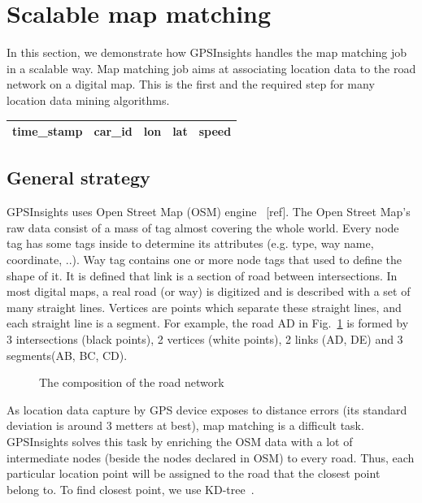 \documentclass{acm_proc_article-sp}
\begin{document}
\section{Scalable map matching}

In this section, we demonstrate how GPSInsights handles the map matching job in a scalable way. Map matching job aims at associating location data to the road network on a digital map. This is the first and the required step for many location data mining algorithms. 

\begin{table}[h]
\centering
\begin{tabular}{|c|c|c|c|c|}
\hline
\textbf{time\_stamp} & \textbf{car\_id} & \textbf{lon}   & \textbf{lat} & \textbf{speed} \\ \hline
\end{tabular}
\end{table}
	
\subsection{General strategy} \label{ssec:links}

GPSInsights uses Open Street Map (OSM) engine ~[ref]. The Open Street Map's raw data consist of a mass of tag almost covering the whole world. Every node tag has some tags inside to determine its attributes (e.g. type, way name, coordinate, ..). Way tag contains one or more node tags that used to define the shape of it. It is defined that link is a section of road between intersections. In most digital maps, a real road (or way) is digitized and is described with a set of many straight lines. Vertices are points which separate these straight lines, and each straight line is a segment. For example, the road AD in Fig.~\ref{fig:composition} is formed by 3 intersections (black points), 2 vertices (white points), 2 links (AD, DE) and 3 segments(AB, BC, CD).
		
\begin{figure}[h]
\centering
{}
\caption{The composition of the road network}
\label{fig:composition}
\end{figure}
	
As location data capture by GPS device exposes to distance errors (its standard deviation is around 3 metters at best), map matching is a difficult task. GPSInsights solves this task by enriching the OSM data with a lot of intermediate nodes (beside the nodes declared in OSM) to every road. Thus, each particular location point will be assigned to the road that the closest point belong to. To find closest point, we use KD-tree~\cite{moh2013approximate}. 
\end{document}
